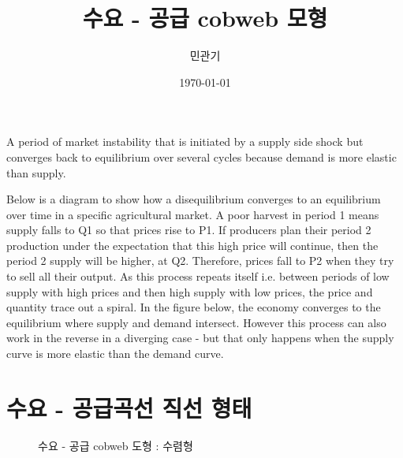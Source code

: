 \documentclass{oblivoir}
\title{수요 - 공급 cobweb 모형}
\author{민관기}
\date{\today}
\newcommand{\dd}{ 
  \pgfmathsetmacro{\xa}{\xb}
  \pgfmathsetmacro{\ya}{\yb}
\pgfmathsetmacro{\xb}{si(\ya)}
 \pgfmathsetmacro{\yb}{d(\xb)}
\draw[->,color=magenta] (\xa,\ya)  edge (\xb,\ya) (\xb,\ya) edge (\xb,\yb);
}
\begin{document}
\maketitle

A period of market instability that is initiated by a supply side shock but converges back to equilibrium over several cycles because demand is more elastic than supply.

Below is a diagram to show how a disequilibrium converges to an equilibrium over time in a specific agricultural market.  
A poor harvest in period 1 means supply falls to Q1 so that prices rise to P1. 
If producers plan their period 2 production under the expectation that this high price will continue, then the period 2 supply will be higher, at Q2. 
Therefore, prices fall to P2 when they try to sell all their output. 
As this process repeats itself i.e. between periods of low supply with high prices and then high supply with low prices, the price and quantity trace out a spiral. 
In the figure below, the economy converges to the equilibrium where supply and demand intersect. 
However this process can also work in the reverse in a diverging case - but that only happens when the supply curve is more elastic than the demand curve.

\section{수요 - 공급곡선 직선 형태}

\begin{figure}[htbp]
\centering
{}
\caption{수요 - 공급 cobweb 도형 : 수렴형}
\end{figure} 
\end{document}
